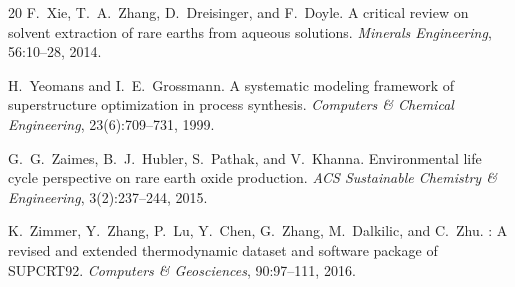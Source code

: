 \documentclass[11pt]{article}
\begin{document}
\begin{thebibliography}{20}
F.~Xie, T.~A.~Zhang, D.~Dreisinger, and F.~Doyle.
\newblock A critical review on solvent extraction of rare earths
  from aqueous solutions.
\newblock \emph{Minerals Engineering}, 56:10--28, 2014.

H.~Yeomans and I.~E.~Grossmann.
\newblock A systematic modeling framework of superstructure
  optimization in process synthesis.
\newblock \emph{Computers \& Chemical Engineering},
  23(6):709--731, 1999.

G.~G.~Zaimes, B.~J.~Hubler, S.~Pathak, and V.~Khanna.
\newblock Environmental life cycle perspective on rare earth oxide
  production.
\newblock \emph{ACS Sustainable Chemistry \& Engineering},
  3(2):237--244, 2015.

K.~Zimmer, Y.~Zhang, P.~Lu, Y.~Chen, G.~Zhang,
  M.~Dalkilic, and C.~Zhu.
: A revised and extended thermodynamic dataset
  and software package of {SUPCRT92}.
\newblock \emph{Computers \& Geosciences}, 90:97--111, 2016.

\end{thebibliography}
\end{document}
